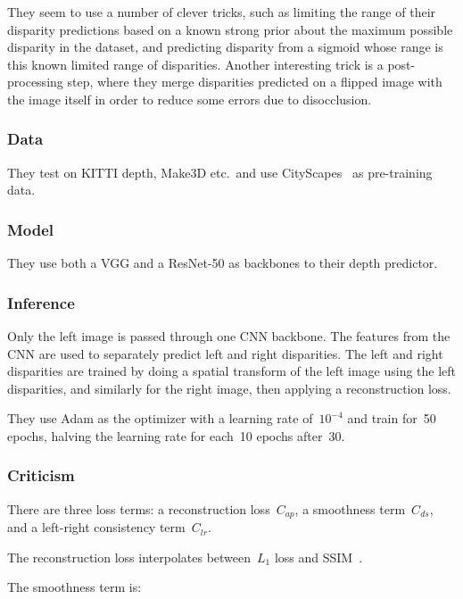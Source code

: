 \documentclass[a4paper, 12pt]{article}
\begin{document}
They seem to use a number of clever tricks, such as limiting the range of their
disparity predictions based on a known strong prior about the maximum possible
disparity in the dataset, and predicting disparity from a sigmoid whose range
is this known limited range of disparities. Another interesting trick is a
post-processing step, where they merge disparities predicted on a flipped image
with the image itself in order to reduce some errors due to disocclusion.


\subsubsection{Data}

They test on KITTI depth, Make3D etc.\ and use
CityScapes~\cite{Cordts_2016_CVPR} as pre-training data.


\subsubsection{Model}

They use both a VGG and a ResNet-50 as backbones to their depth predictor.


\subsubsection{Inference}

Only the left image is passed through one CNN backbone. The features from the
CNN are used to separately predict left and right disparities. The left and
right disparities are trained by doing a spatial transform of the left image
using the left disparities, and similarly for the right image, then applying a
reconstruction loss.

They use Adam as the optimizer with a learning rate of~$10^{-4}$ and train
for~\num{50} epochs, halving the learning rate for each~\num{10} epochs
after~\num{30}.


\subsubsection{Criticism}

There are three loss terms: a reconstruction loss~$C_{ap}$, a smoothness
term~$C_{ds}$, and a left-right consistency term~$C_{lr}$.

The reconstruction loss interpolates between~$L_1$ loss and
SSIM~\citet{wang-image-ssim-2004}.

The smoothness term is:
\end{document}
